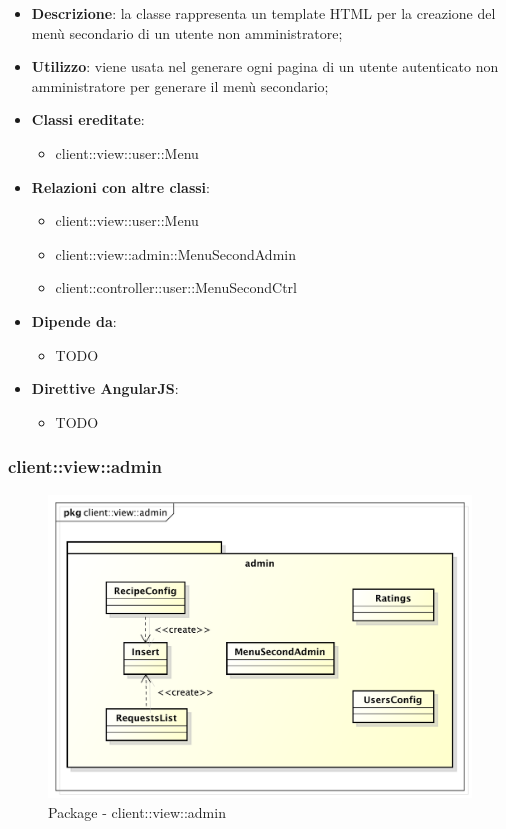 			\begin{itemize}
				\item \textbf{Descrizione}: la classe rappresenta un template HTML per la creazione del menù secondario di un utente non amministratore;
				\item \textbf{Utilizzo}: viene usata nel generare ogni pagina di un utente autenticato non amministratore per generare il menù secondario;
				\item \textbf{Classi ereditate}:
					\begin{itemize}
						\item client::view::user::Menu
					\end{itemize}
				\item \textbf{Relazioni con altre classi}:
					\begin{itemize}
						\item client::view::user::Menu
						\item client::view::admin::MenuSecondAdmin
						\item client::controller::user::MenuSecondCtrl
					\end{itemize}
				\item \textbf{Dipende da}:
					\begin{itemize}
						\item TODO
					\end{itemize}
				\item \textbf{Direttive AngularJS}:
					\begin{itemize}
						\item TODO
					\end{itemize}
			\end{itemize}

\subsubsection{client::view::admin} %
\label{ssub:bdsm_app_client_view_admin}
\begin{figure}[htbp]
	\centering
	\centerline{\includegraphics[scale=0.4]{./images/client/client_view_admin.pdf}}
	\caption{Package - client::view::admin}
\end{figure}

